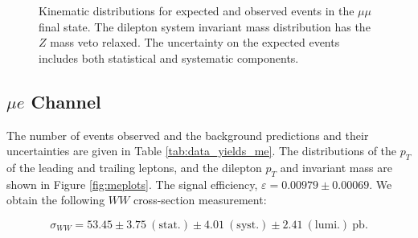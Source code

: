 \begin{figure}[!hbtp]
\begin{center}
\caption{Kinematic distributions for expected and observed events in the $\mu\mu$ final state.
The dilepton system invariant mass distribution has the $Z$ mass veto relaxed.
The uncertainty on the expected events includes both statistical and systematic components.}
\label{fig:mmplots}
\end{center}
\end{figure}

%
%
%
\clearpage
\subsection{$\mu e$ Channel}

The number of events observed and the background predictions and their uncertainties are
given in Table \ref{tab:data_yields_me}.
The distributions of the $p_{T}$ of the leading and trailing leptons, and the dilepton $p_{T}$
and invariant mass are shown in Figure \ref{fig:meplots}.
The signal efficiency,  $\varepsilon = 0.00979 \pm 0.00069$.
We obtain the following $WW$ cross-section measurement:

\begin{equation*}
\sigma_{WW}  = 53.45 \pm 3.75~\mathrm{(stat.)} \pm 4.01~\mathrm{(syst.)} \pm 2.41~\mathrm{(lumi.)~pb}. 
\end{equation*}

